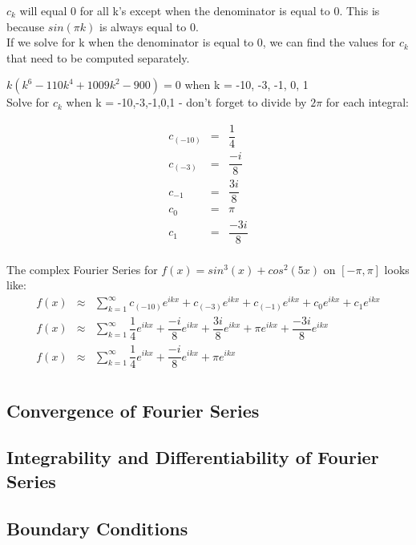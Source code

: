 \documentclass{article}
\newcommand{\bea}{\begin{eqnarray*}}
\newcommand{\eea}{\end{eqnarray*}}
\newcommand{\red}[1]{\textcolor{red}{#1}}
\newcommand{\blue}[1]{\textcolor{blue}{#1}}
\begin{document}
$c_k$ will equal 0 for all k's except when the denominator is equal to 0. This is because $sin(\pi k)$ is always equal to 0.\\

If we solve for k when the denominator is equal to 0, we can find the values for $c_k$ that need to be computed separately. \newline

$k(k^6-110k^4+1009k^2-900)=0$ when k = -10, -3, -1, 0, 1 \\

Solve for $c_k$ when k = -10,-3,-1,0,1 - don't forget to divide by $2\pi$ for each integral:\newline

\bea
c_{(-10)} &=& \dfrac{1}{4} \\
c_{(-3)} &=& \dfrac{-i}{8} \\
c_{-1} &=& \dfrac{3i}{8} \\
c_0 &=& \pi \\
c_1 &=& \dfrac{-3i}{8}\\
\eea

The complex Fourier Series for $f(x) = sin^3(x)+cos^2(5x)$ on $[-\pi,\pi]$ looks like:
\bea
f(x) &\approx& \sum_{k=1}^{\infty} c_{(-10)}e^{ikx} + c_{(-3)}e^{ikx} + c_{(-1)}e^{ikx} + c_{0}e^{ikx} + c_{1}e^{ikx} \\
f(x) &\approx& \sum_{k=1}^{\infty} \dfrac{1}{4}e^{ikx} + \dfrac{-i}{8}e^{ikx} + \dfrac{3i}{8}e^{ikx} + \pi e^{ikx} + \dfrac{-3i}{8}e^{ikx} \\
f(x) &\approx&  \sum_{k=1}^{\infty} \dfrac{1}{4}e^{ikx} + \dfrac{-i}{8}e^{ikx} + \pi e^{ikx}\\
\eea



\subsection{Convergence of Fourier Series}

\subsection{Integrability and Differentiability of Fourier Series}

\subsection{Boundary Conditions}
\end{document}
